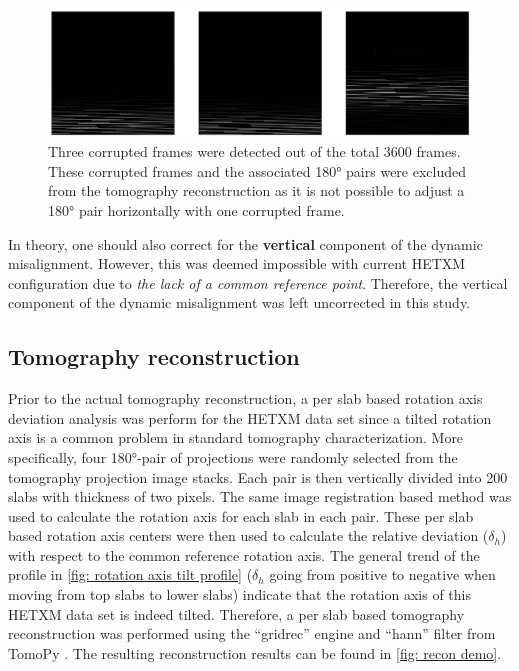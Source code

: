 \documentclass[12pt]{scrartcl}
\newcommand{\myscale}{1}
\begin{document}
\renewcommand{\myscale}{0.5}
\begin{figure}[htp]
\centering
\includegraphics[scale=\myscale]{corruptedFrames}
\caption{
Three corrupted frames were detected out of the total 3600 frames.
These corrupted frames and the associated \ang{180} pairs were excluded from the tomography reconstruction as it is not possible to adjust a \ang{180} pair horizontally with one corrupted frame.
}\label{fig: corrupted frames}
\end{figure}

In theory, one should also correct for the \textbf{vertical} component of the dynamic misalignment.
However, this was deemed impossible with current HETXM configuration due to \textit{the lack of a common reference point}.
Therefore, the vertical component of the dynamic misalignment was left uncorrected in this study.


\subsection{Tomography reconstruction}\label{sec: tomo recon}

Prior to the actual tomography reconstruction,  a per slab based rotation axis deviation analysis was perform for the HETXM data set since a tilted rotation axis is a common problem in standard tomography characterization.
More specifically, four \ang{180}-pair of projections were randomly selected from the tomography projection image stacks.
Each pair is then vertically divided into 200 slabs with thickness of two pixels.
The same image registration based method was used to calculate the rotation axis for each slab in each pair.
These per slab based rotation axis centers were then used to calculate the relative deviation ($\delta_h$) with respect to the common reference rotation axis.
The general trend of the profile in \cref{fig: rotation axis tilt profile} ($\delta_h$ going from positive to negative when moving from top slabs to lower slabs) indicate that the rotation axis of this HETXM data set is indeed tilted.
Therefore, a per slab based tomography reconstruction was performed using the ``gridrec'' engine and ``hann'' filter from TomoPy \citep{Gursoy_etal2014}.
The resulting reconstruction results can be found in \cref{fig: recon demo}. 
\end{document}
